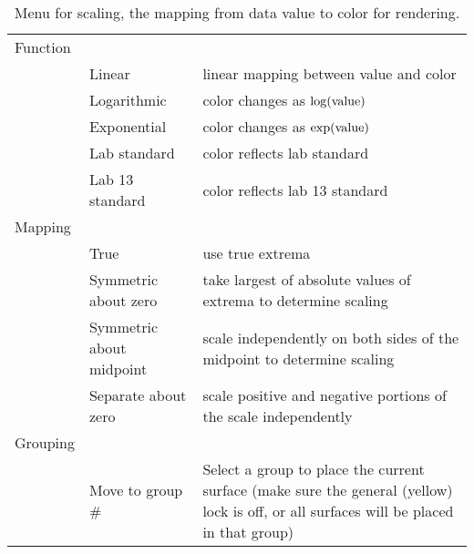 \begin{table}[ht]
\begin{center}
\begin{tabular}{|l|l|p{3 in}|}
    Function & & \\
    &  Linear & linear mapping between value and color \\ \hline
    &  Logarithmic & color changes as  $\log({\rm value})$ \\ \hline
    &  Exponential & color changes as  $\exp({\rm value})$ \\ 
    &  Lab standard & color reflects lab standard \\ \hline
    &  Lab 13 standard & color reflects lab 13 standard \\ \hline
    Mapping & & \\
    &  True & use true extrema \\ 
    &  Symmetric about zero & take largest of absolute values of extrema to
    determine scaling \\
    &  Symmetric about midpoint & scale independently on both sides of the
    midpoint to determine scaling \\
    &  Separate about zero & scale positive and negative portions of the
    scale independently \\ \hline
    Grouping & & \\
    &  Move to group \# & Select a group to place the current surface
    (make sure the general (yellow) lock is off, or all surfaces
    will be placed in that group) \\ \hline
    \end{tabular}
  \end{center}
\caption{Menu for scaling, the mapping from data value to color for
rendering. }
\label{table:scaling}
\end{table}

